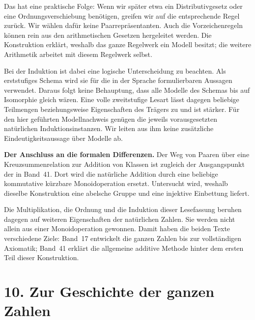 Das hat eine praktische Folge: Wenn wir später etwa ein
Distributivgesetz oder eine Ordnungsverschiebung benötigen,
greifen wir auf die entsprechende Regel zurück. Wir wählen
dafür keine Paarrepräsentanten. Auch die Vorzeichenregeln
können rein aus den arithmetischen Gesetzen hergeleitet werden.
Die Konstruktion erklärt, weshalb das ganze Regelwerk ein
Modell besitzt; die weitere Arithmetik arbeitet mit diesem
Regelwerk selbst.

Bei der Induktion ist dabei eine logische Unterscheidung zu
beachten. Als erststufiges Schema wird sie für die in der
Sprache formulierbaren Aussagen verwendet. Daraus folgt keine
Behauptung, dass alle Modelle des Schemas bis auf Isomorphie
gleich wären. Eine volle zweitstufige Lesart lässt dagegen
beliebige Teilmengen beziehungsweise Eigenschaften des Trägers
zu und ist stärker. Für den hier geführten Modellnachweis
genügen die jeweils vorausgesetzten natürlichen
Induktionsinstanzen. Wir leiten aus ihm keine zusätzliche
Eindeutigkeitsaussage über Modelle ab.

\medskip\noindent\textbf{Der Anschluss an die formalen Differenzen.}
Der Weg von Paaren über eine Kreuzsummenrelation zur Addition
von Klassen ist zugleich der Ausgangspunkt der
\DifferencesReadingLink{} in Band~41. Dort wird die
natürliche Addition durch eine beliebige kommutative kürzbare
Monoidoperation ersetzt. Untersucht wird, weshalb dieselbe
Konstruktion eine abelsche Gruppe und eine injektive Einbettung
liefert.

Die Multiplikation, die Ordnung und die Induktion dieser
Lesefassung beruhen dagegen auf weiteren Eigenschaften der
natürlichen Zahlen. Sie werden nicht allein aus einer
Monoidoperation gewonnen. Damit haben die beiden Texte
verschiedene Ziele: Band~17 entwickelt die ganzen Zahlen bis
zur vollständigen Axiomatik; Band~41 erklärt die allgemeine
additive Methode hinter dem ersten Teil dieser Konstruktion.

\clearpage
\hypertarget{integers.reading.history}{}
\section*{10. Zur Geschichte der ganzen Zahlen}

